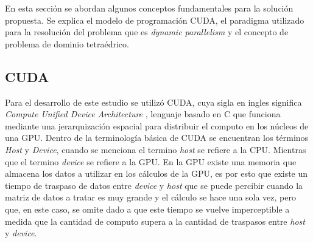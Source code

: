 \documentclass[10pt, conference, compsocconf, onecolumn]{IEEEtran}
\begin{document}
En esta secci\'on se abordan algunos conceptos fundamentales para la soluci\'on propuesta. Se explica el modelo de programaci\'on CUDA, el paradigma utilizado para la resoluci\'on del problema que es \textit{dynamic parallelism} y el concepto de problema de dominio tetra\'edrico.

\subsection{CUDA}
\label{sub_sec_ModCuda}

Para el desarrollo de este estudio se utiliz\'o CUDA, cuya sigla en ingles significa \textit{Compute Unified Device Architecture} \cite{ScalCuda2008}, lenguaje basado en C que funciona mediante una jerarquizaci\'on espacial para distribuir el computo en los n\'ucleos de una GPU. Dentro de la terminolog\'ia b\'asica de CUDA se encuentran los t\'erminos \textit{Host} y \textit{Device}, cuando se menciona el termino \textit{host} se refiere a la CPU. Mientras que el termino \textit{device} se refiere a la GPU. En la GPU  existe una memoria que almacena los datos a utilizar en los c\'alculos de la GPU,  es por esto que existe un tiempo de traspaso de datos entre \textit{device} y \textit{host} que se puede percibir cuando la matriz de datos a tratar es muy grande y el c\'alculo se hace una sola vez, pero que, en este caso, se omite dado a que este tiempo se vuelve imperceptible a medida que la cantidad de computo supera a la cantidad de traspasos entre \textit{host} y \textit{device}.
\end{document}
